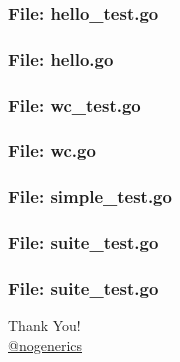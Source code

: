 \documentclass[aspectratio=169]{beamer}
\begin{document}
\begin{frame}[fragile]
  \frametitle{File: hello\_test.go}

  

\end{frame}


\begin{frame}[fragile]
  \frametitle{File: hello.go}

  

\end{frame}


\begin{frame}[fragile]
  \frametitle{File: wc\_test.go}

  

\end{frame}

\begin{frame}[fragile]
  \frametitle{File: wc.go}

  

\end{frame}

\begin{frame}[fragile]
  \frametitle{File: simple\_test.go}

  

\end{frame}

\begin{frame}[fragile]
  \frametitle{File: suite\_test.go}

  

\end{frame}

\begin{frame}[fragile]
  \frametitle{File: suite\_test.go}

  

\end{frame}

\begin{frame}%
\begin{center}
{\huge Thank You!}\\[1cm]
{\large \href{https://twitter.com/nogenerics}{@nogenerics}}
\end{center}
\end{frame}
\end{document}
